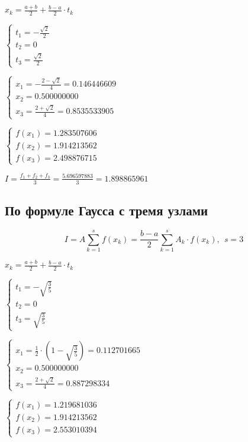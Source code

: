 $x_k = \frac{a + b}{2} + \frac{b - a}{2} \cdot t_k$


$
 \begin{cases}
   t_1 = - \frac{\sqrt{2}}{2}
   \\
   t_2 = 0
   \\
   t_3 = \frac{\sqrt{2}}{2}
 \end{cases}
$


$
 \begin{cases}
   x_1 = - \frac{2 - \sqrt{2}}{4} = 0.146446609
   \\
   x_2 = 0.500000000
   \\
   x_3 = \frac{2 + \sqrt{2}}{4} = 0.8535533905
 \end{cases}
$

$
 \begin{cases}
   f(x_1) = 1.283507606
   \\
   f(x_2) = 1.914213562
   \\
   f(x_3) = 2.498876715
 \end{cases}
$

$I = \frac{f_1 + f_2 + f_3}{3} = \frac{5.696597883}{3} = 1.898865961$

\subsection{По формуле Гаусса с тремя узлами}

\begin{displaymath}
I = A \sum_{k=1}^{s} f(x_k) = \frac{b - a}{2} \sum_{k=1}^{s} A_k \cdot f(x_k),\ \ s = 3
\end{displaymath}

$x_k = \frac{a + b}{2} + \frac{b - a}{2} \cdot t_k$


$
 \begin{cases}
   t_1 = - \sqrt{\frac{3}{5}}
   \\
   t_2 = 0
   \\
   t_3 = \sqrt{\frac{3}{5}}
 \end{cases}
$


$
 \begin{cases}
   x_1 = \frac{1}{2} \cdot ( 1 - \sqrt{\frac{3}{5}}) = 0.112701665
   \\
   x_2 = 0.500000000
   \\
   x_3 = \frac{2 + \sqrt{2}}{4} = 0.887298334
 \end{cases}
$

$
 \begin{cases}
   f(x_1) = 1.219681036
   \\
   f(x_2) = 1.914213562
   \\
   f(x_3) = 2.553010394
 \end{cases}
$

